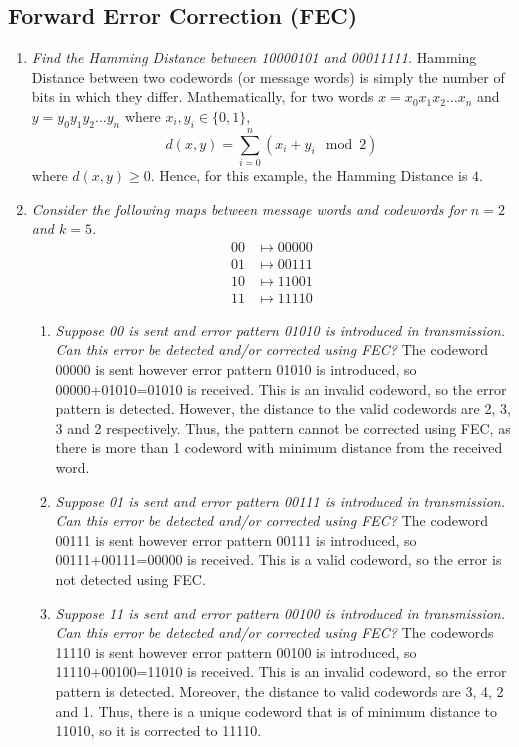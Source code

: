 \documentclass{article}
\begin{document}
\subsection*{Forward Error Correction (FEC)}
\begin{enumerate}
    \item {\it Find the Hamming Distance between 10000101 and 00011111.} Hamming Distance between two 
    codewords (or message words) is simply the number of bits in which they differ. Mathematically, for
    two words $x=x_0x_1x_2\dots x_n$ and $y=y_0y_1y_2\dots y_n$ where $x_i,y_i\in\{0,1\}$, 
    \[
        d(x,y)=\sum_{i=0}^n (x_i+y_i\mod 2)
    \]
    where $d(x,y)\geq0$. Hence, for this example, the Hamming Distance is $4$.
    
    \item{\it Consider the following maps between message words and codewords for $n=2$ and $k=5$.}
    \begin{align*}
        00&\mapsto00000\\
        01&\mapsto00111\\
        10&\mapsto11001\\
        11&\mapsto11110
    \end{align*}
    \begin{enumerate}
        \item {\it Suppose 00 is sent and error pattern 01010 is introduced in transmission.
        Can this error be detected and/or corrected using FEC?}
        The codeword 00000 is sent however error pattern 01010 is introduced, so 00000+01010=01010 is
        received. This is an invalid codeword, so the error pattern is detected. However, the distance to
        the valid codewords are 2, 3, 3 and 2 respectively. Thus, the pattern cannot be corrected using FEC,
        as there is more than 1 codeword with minimum distance from the received word.
        
        \item {\it Suppose 01 is sent and error pattern 00111 is introduced in transmission.
        Can this error be detected and/or corrected using FEC?}
        The codeword 00111 is sent however error pattern 00111 is introduced, so 00111+00111=00000 is
        received. This is a valid codeword, so the error is not detected using FEC.
        
        \item {\it Suppose 11 is sent and error pattern 00100 is introduced in transmission.
        Can this error be detected and/or corrected using FEC?}
        The codewords 11110 is sent however error pattern 00100 is introduced, so 11110+00100=11010 is
        received. This is an invalid codeword, so the error pattern is detected. Moreover, the distance
        to valid codewords are 3, 4, 2 and 1. Thus, there is a unique codeword that is of minimum distance
        to 11010, so it is corrected to 11110.
    \end{enumerate}
\end{enumerate}
\end{document}
